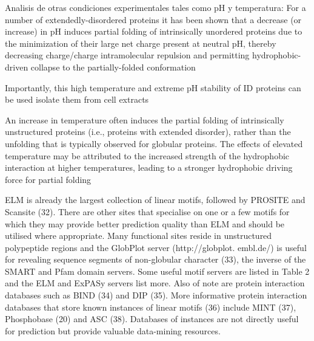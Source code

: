 Analisis de otras condiciones experimentales tales como pH y temperatura:
For a number of extendedly-disordered proteins it has been shown that a decrease (or increase) in pH induces partial folding of intrinsically unordered proteins due to the minimization of
their large net charge present at neutral pH, thereby decreasing charge/charge intramolecular repulsion and permitting hydrophobic-driven collapse to the partially-folded conformation

Importantly, this high temperature and extreme pH stability of ID proteins can be used isolate them from cell extracts

An increase in temperature often induces the partial folding of intrinsically unstructured
proteins (i.e., proteins with extended disorder), rather than the unfolding that is typically
observed for globular proteins. The effects of elevated temperature may be attributed to the
increased strength of the hydrophobic interaction at higher temperatures, leading to a stronger
hydrophobic driving force for partial folding




ELM is already the largest collection of linear motifs, followed
by PROSITE and Scansite (32). There are other sites that
specialise on one or a few motifs for which they may provide
better prediction quality than ELM and should be utilised
where appropriate. Many functional sites reside in unstructured
polypeptide regions and the GlobPlot server (http://globplot.
embl.de/) is useful for revealing sequence segments of
non-globular character (33), the inverse of the SMART and
Pfam domain servers. Some useful motif servers are listed in
Table 2 and the ELM and ExPASy servers list more. Also of
note are protein interaction databases such as BIND (34) and
DIP (35). More informative protein interaction databases that
store known instances of linear motifs (36) include MINT (37),
Phosphobase (20) and ASC (38). Databases of instances are
not directly useful for prediction but provide valuable
data-mining resources.